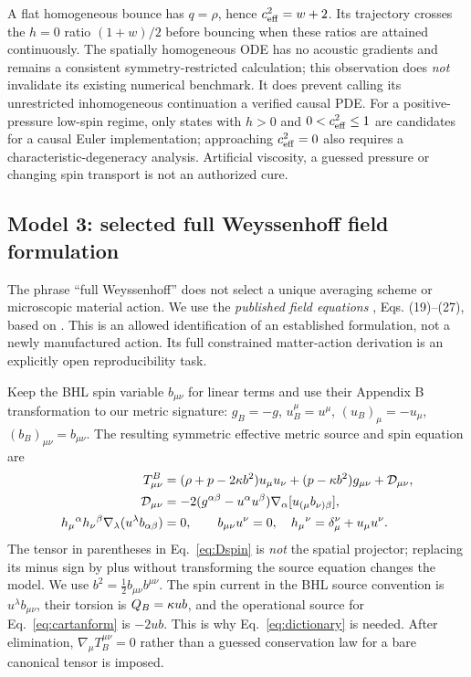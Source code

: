 A flat homogeneous bounce has $q=\rho$, hence $c_{\rm eff}^2=w+2$. Its trajectory crosses the $h=0$ ratio $(1+w)/2$ before bouncing when these ratios are attained continuously. The spatially homogeneous ODE has no acoustic gradients and remains a consistent symmetry-restricted calculation; this observation does \emph{not} invalidate its existing numerical benchmark. It does prevent calling its unrestricted inhomogeneous continuation a verified causal PDE. For a positive-pressure low-spin regime, only states with $h>0$ and $0<c_{\rm eff}^2\leq1$ are candidates for a causal Euler implementation; approaching $c_{\rm eff}^2=0$ also requires a characteristic-degeneracy analysis. Artificial viscosity, a guessed pressure or changing spin transport is not an authorized cure.

\subsection{Model 3: selected full Weyssenhoff field formulation}
The phrase ``full Weyssenhoff'' does not select a unique averaging scheme or microscopic material action. We use the \emph{published field equations} \cite{BHL}, Eqs. (19)--(27), based on \cite{OK}. This is an allowed identification of an established formulation, not a newly manufactured action. Its full constrained matter-action derivation is an explicitly open reproducibility task.

Keep the BHL spin variable $b_{\mu\nu}$ for linear terms and use their Appendix B transformation to our metric signature: $g_B=-g$, $u_B^\mu=u^\mu$, $(u_B)_\mu=-u_\mu$, $(b_B)_{\mu\nu}=b_{\mu\nu}$. The resulting symmetric effective metric source and spin equation are
\begin{align}
 T_{\mu\nu}^{B}&=(\rho+p-2\kappa b^2)u_\mu u_\nu+(p-\kappa b^2)g_{\mu\nu}+\mathcal D_{\mu\nu},\label{eq:fullstress}\\
 \mathcal D_{\mu\nu}&=-2(g^{\alpha\beta}-u^\alpha u^\beta)\nabla_\alpha[u_{(\mu}b_{\nu)\beta}],\label{eq:Dspin}\\
 h_\mu{}^\alpha h_\nu{}^\beta\nabla_\lambda(u^\lambda b_{\alpha\beta})&=0,
 \qquad b_{\mu\nu}u^\nu=0,\quad h_\mu{}^\nu=\delta_\mu^\nu+u_\mu u^\nu.\label{eq:fulltransport}
\end{align}
The tensor in parentheses in Eq.~\eqref{eq:Dspin} is \emph{not} the spatial projector; replacing its minus sign by plus without transforming the source equation changes the model. We use $b^2=\tfrac12 b_{\mu\nu}b^{\mu\nu}$. The spin current in the BHL source convention is $u^\lambda b_{\mu\nu}$, their torsion is $Q_B=\kappa u b$, and the operational source for Eq.~\eqref{eq:cartanform} is $-2u b$. This is why Eq.~\eqref{eq:dictionary} is needed. After elimination, $\nabla_\mu T_B^{\mu\nu}=0$ rather than a guessed conservation law for a bare canonical tensor is imposed.

